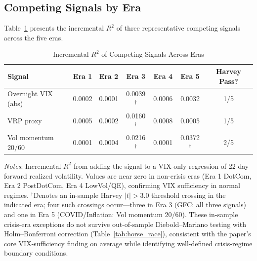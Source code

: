\documentclass[12pt,a4paper]{article}
\begin{document}
\subsection{Competing Signals by Era}

Table~\ref{tab:competing_eras} presents the incremental $R^2$ of three representative competing signals across the five eras.

\begin{table}[H]
\centering
\small
\begin{threeparttable}
\caption{Incremental $R^2$ of Competing Signals Across Eras}
\label{tab:competing_eras}
\begin{tabular}{@{}lcccccc@{}}
\toprule
Signal & Era 1 & Era 2 & Era 3 & Era 4 & Era 5 & Harvey Pass? \\
\midrule
Overnight VIX (abs) & 0.0002 & 0.0001 & 0.0039$^{\dagger}$ & 0.0006 & 0.0032 & 1/5 \\
VRP proxy & 0.0005 & 0.0002 & 0.0160$^{\dagger}$ & 0.0008 & 0.0005 & 1/5 \\
Vol momentum 20/60 & 0.0001 & 0.0004 & 0.0216$^{\dagger}$ & 0.0001 & 0.0372$^{\dagger}$ & 2/5 \\
\bottomrule
\end{tabular}
\begin{tablenotes}
\small
\item \textit{Notes}: Incremental $R^2$ from adding the signal to a VIX-only regression of 22-day forward realized volatility. Values are near zero in non-crisis eras (Era 1 DotCom, Era 2 PostDotCom, Era 4 LowVol/QE), confirming VIX sufficiency in normal regimes. $^{\dagger}$Denotes an in-sample Harvey $|t|>3.0$ threshold crossing in the indicated era; four such crossings occur---three in Era 3 (GFC: all three signals) and one in Era 5 (COVID/Inflation: Vol momentum 20/60). These in-sample crisis-era exceptions do not survive out-of-sample Diebold--Mariano testing with Holm--Bonferroni correction (Table~\ref{tab:horse_race}), consistent with the paper's core VIX-sufficiency finding on average while identifying well-defined crisis-regime boundary conditions.
\end{tablenotes}
\end{threeparttable}
\end{table}
\end{document}
